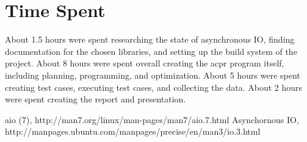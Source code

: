 \documentclass[11pt]{article}
\begin{document}
\section{Time Spent}

About 1.5 hours were spent researching the state of asynchronous IO, finding
documentation for the chosen libraries, and setting up the build system of the
project.
About 8 hours were spent overall creating the acpr program itself, including planning, programming, and optimization.
About 5 hours were spent creating test cases, executing test cases, and collecting the data.
About 2 hours were spent creating the report and presentation.

\begin{thebibliography}{99}
        aio (7), http://man7.org/linux/man-pages/man7/aio.7.html
        Asynchornous IO, http://manpages.ubuntu.com/manpages/precise/en/man3/io.3.html
\end{thebibliography}
\end{document}
